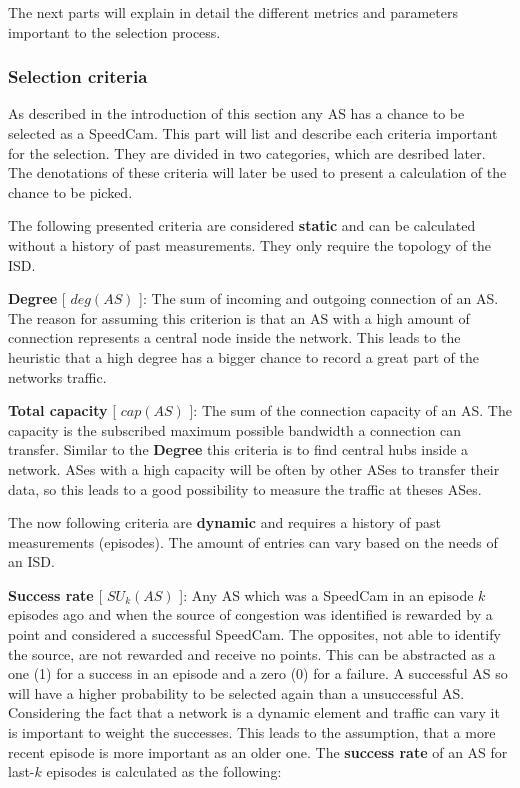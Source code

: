 \documentclass[thesis.tex]{subfiles}
\begin{document}
The next parts will explain in detail the different metrics and parameters important to the selection process.


\subsubsection{Selection criteria}

As described in the introduction of this section any AS has a chance to be selected as a SpeedCam. This part will list and describe each criteria important for the selection. They are divided in two categories, which are desribed later. The denotations of these criteria will later be used to present a calculation of the chance to be picked.

The following presented criteria are considered \textbf{static} and can be calculated without a history of past measurements. They only require the topology of the ISD.

\textbf{Degree} [ $deg(AS)$ ]: The sum of incoming and outgoing connection of an AS. The reason for assuming this criterion is that an AS with a high amount of connection represents a central node inside the network. This leads to the heuristic that a high degree has a bigger chance to record a great part of the networks traffic.

\textbf{Total capacity} [ $cap(AS)$ ]: The sum of the connection capacity of an AS. The capacity is the subscribed maximum possible bandwidth a connection can transfer. Similar to the \textbf{Degree} this criteria is to find central hubs inside a network. ASes with a high capacity will be often by other ASes to transfer their data, so this leads to a good possibility to measure the traffic at theses ASes.

The now following criteria are \textbf{dynamic} and requires a history of past measurements (episodes). The amount of entries can vary based on the needs of an ISD.

\textbf{Success rate} [ $SU_k(AS)$ ]: Any AS which was a SpeedCam in an episode $k$ episodes ago and when the source of congestion was identified is rewarded by a point and considered a successful SpeedCam. The opposites, not able to identify the source, are not rewarded and receive no points. This can be abstracted as a one (1) for a success in an episode and a zero (0) for a failure. A successful AS so will have a higher probability to be selected again than a unsuccessful AS. 
Considering the fact that a network is a dynamic element and traffic can vary it is important to weight the successes. This leads to the assumption, that a more recent episode is more important as an older one. The \textbf{success rate} of an AS for last-$k$ episodes is calculated as the following:
\end{document}
